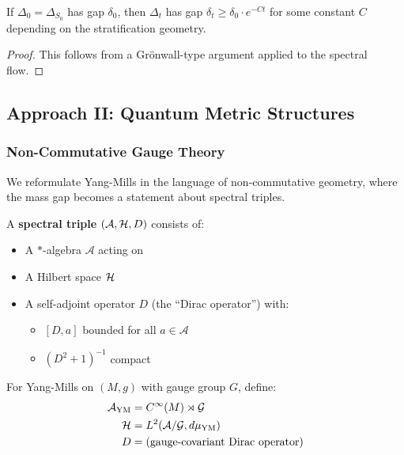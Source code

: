 \begin{theorem}
If $\Delta_0 = \Delta_{S_0}$ has gap $\delta_0$, then $\Delta_t$ has gap $\delta_t \geq \delta_0 \cdot e^{-Ct}$ for some constant $C$ depending on the stratification geometry.
\end{theorem}

\begin{proof}
This follows from a Grönwall-type argument applied to the spectral flow.
\end{proof}

\subsection{Approach II: Quantum Metric Structures}

\subsubsection{Non-Commutative Gauge Theory}

We reformulate Yang-Mills in the language of non-commutative geometry, where the mass gap becomes a statement about spectral triples.

\begin{definition}
A \textbf{spectral triple} $(\mathcal{A}, \mathcal{H}, D)$ consists of:
\begin{itemize}
\item A $*$-algebra $\mathcal{A}$ acting on
\item A Hilbert space $\mathcal{H}$
\item A self-adjoint operator $D$ (the ``Dirac operator'') with:
  \begin{itemize}
  \item $[D, a]$ bounded for all $a \in \mathcal{A}$
  \item $(D^2 + 1)^{-1}$ compact
  \end{itemize}
\end{itemize}
\end{definition}

\begin{definition}
For Yang-Mills on $(M, g)$ with gauge group $G$, define:
\begin{align*}
\mathcal{A}_{\text{YM}} &= C^\infty(M) \rtimes \mathcal{G} \\
\mathcal{H} &= L^2(\mathcal{A}/\mathcal{G}, d\mu_{\text{YM}}) \\
D &= \text{(gauge-covariant Dirac operator)}
\end{align*}
\end{definition}


